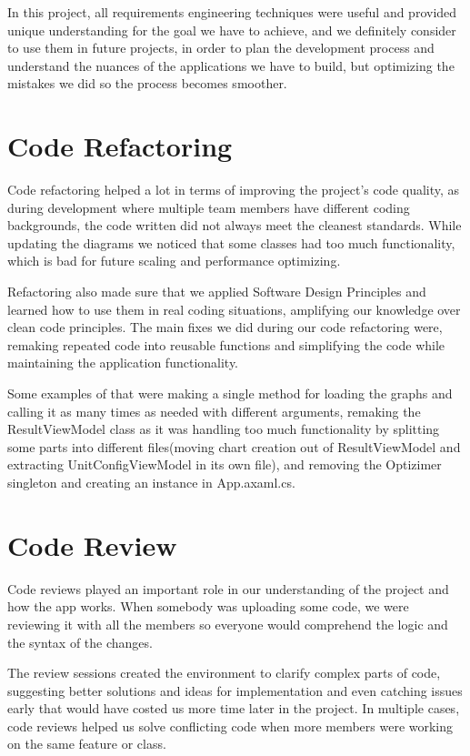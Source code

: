 In this project, all requirements engineering techniques were useful and provided unique understanding for the goal we have to achieve, and we definitely consider to use them in future projects, in order to plan the development process and understand the nuances of the applications we have to build, but optimizing the mistakes we did so the process becomes smoother.



\section{Code Refactoring}

Code refactoring helped a lot in terms of improving the project’s code quality, as during development where multiple team members have different coding backgrounds, the code written did not always meet the cleanest standards. While updating the diagrams we noticed that some classes had too much functionality, which is bad for future scaling and performance optimizing. 

Refactoring also made sure that we applied Software Design Principles and learned how to use them in real coding situations, amplifying our knowledge over clean code principles. The main fixes we did during our code refactoring were, remaking repeated code into reusable functions and simplifying the code while maintaining the application functionality.

Some examples of that were making a single method for loading the graphs and calling it as many times as needed with different arguments, remaking the ResultViewModel class as it was handling too much functionality by splitting some parts into different files(moving
chart creation out of ResultViewModel and extracting UnitConfigViewModel in its own file), and removing the Optizimer singleton and creating an instance in App.axaml.cs.


\section{Code Review}

Code reviews played an important role in our understanding of the project and how the app works. When somebody was uploading some code, we were reviewing it with all the members so everyone would comprehend the logic and the syntax of the changes. 

The review sessions created the environment to clarify complex parts of code, suggesting better solutions and ideas for implementation and even catching issues early that would have costed us more time later in the project. In multiple cases, code reviews helped us solve conflicting code when more members were working on the same feature or class.

